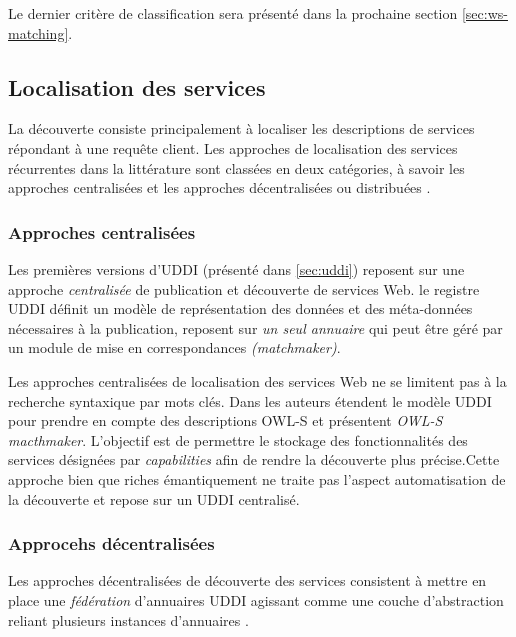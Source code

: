 Le dernier critère de classification sera présenté dans la prochaine
section \ref{sec:ws-matching}.

\subsection{Localisation des services}
\label{sec:ws-localisation}

  La découverte consiste principalement à localiser les descriptions
  de services répondant à une requête client. Les approches de
  localisation des services récurrentes dans la littérature sont
  classées en deux catégories, à savoir les approches centralisées et
  les approches décentralisées ou distribuées
  \cite{garofalakis2004web}.

    \subsubsection{Approches centralisées}
    \label{sec:central-disc}

    Les premières versions d'\textsc{UDDI} \cite{clement2004uddi}
    (présenté dans \ref{sec:uddi}) reposent sur une approche
    \textit{centralisée} de publication et découverte de services
    Web. le registre \textsc{UDDI} définit un modèle de représentation
    des données et des méta-données nécessaires à la publication,
    reposent sur \textit{un seul annuaire} qui peut être géré par un
    module de mise en correspondances \textit{(matchmaker)}.

    Les approches centralisées de localisation des services Web ne se
    limitent pas à la recherche syntaxique par mots clés. Dans
    \cite{srinivasan2004adding} les auteurs étendent le modèle
    \textsc{UDDI} pour prendre en compte des descriptions
    \textsc{OWL-S} et présentent \textit{OWL-S macthmaker}. L'objectif
    est de permettre le stockage des fonctionnalités des services
    désignées par \textit{capabilities} afin de rendre la découverte
    plus précise.Cette approche bien que riches émantiquement ne
    traite pas l'aspect automatisation de la découverte et repose sur
    un \textsc{UDDI} centralisé.

    \subsubsection{Approcehs décentralisées}
    \label{sec:decentr-disc}

    Les approches décentralisées de découverte des services consistent
    à mettre en place une \textit{fédération} d'annuaires
    \textsc{UDDI} agissant comme une couche d'abstraction reliant
    plusieurs instances d'annuaires \cite {rompothong2003query,
      sivashanmugam2004discovery}.

